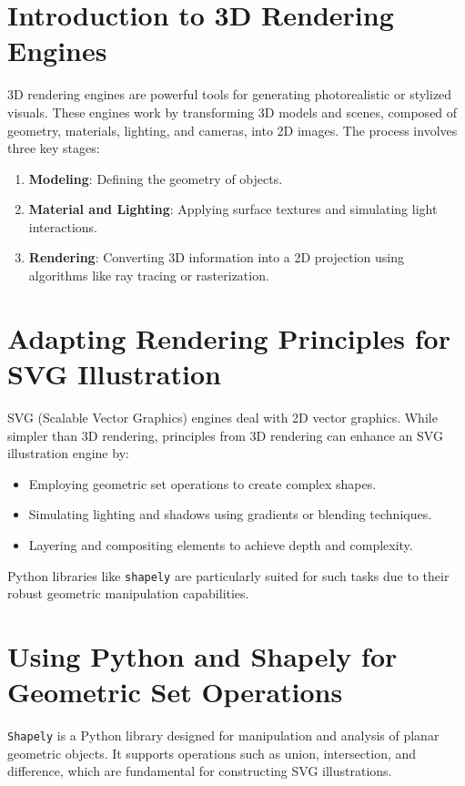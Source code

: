 \section{Introduction to 3D Rendering Engines}
3D rendering engines are powerful tools for generating photorealistic or stylized visuals. These engines work by transforming 3D models and scenes, composed of geometry, materials, lighting, and cameras, into 2D images. The process involves three key stages:

\begin{enumerate}
    \item \textbf{Modeling}: Defining the geometry of objects.
    \item \textbf{Material and Lighting}: Applying surface textures and simulating light interactions.
    \item \textbf{Rendering}: Converting 3D information into a 2D projection using algorithms like ray tracing or rasterization.
\end{enumerate}

\section{Adapting Rendering Principles for SVG Illustration}
SVG (Scalable Vector Graphics) engines deal with 2D vector graphics. While simpler than 3D rendering, principles from 3D rendering can enhance an SVG illustration engine by:

\begin{itemize}
    \item Employing geometric set operations to create complex shapes.
    \item Simulating lighting and shadows using gradients or blending techniques.
    \item Layering and compositing elements to achieve depth and complexity.
\end{itemize}

Python libraries like \texttt{shapely} are particularly suited for such tasks due to their robust geometric manipulation capabilities.

\section{Using Python and Shapely for Geometric Set Operations}
\texttt{Shapely} is a Python library designed for manipulation and analysis of planar geometric objects. It supports operations such as union, intersection, and difference, which are fundamental for constructing SVG illustrations.


